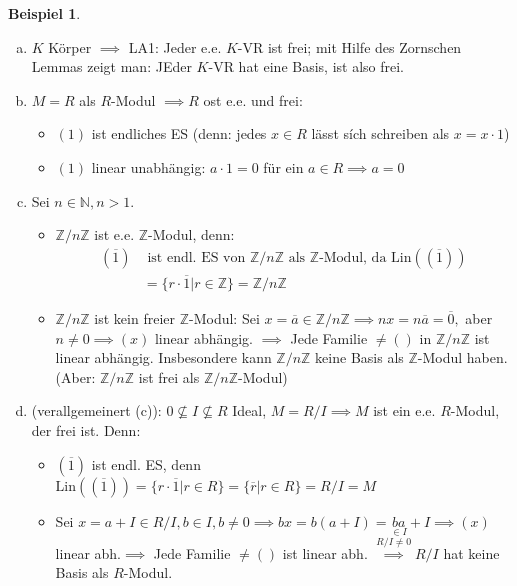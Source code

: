 \documentclass[a4paper, titlepage]{article}
\theoremstyle{definition}
\newtheorem{bsp}[satz]{Beispiel}
\newcommand{\N}{\mathbb{N}}
\newcommand{\Z}{\mathbb{Z}}
\newcommand{\Lin}{\mathrm{Lin}}
\begin{document}
        \begin{bsp}
            \begin{enumerate}[(a)]
                \item $K$ Körper $\implies$ LA1: Jeder e.e. $K$-VR ist frei; mit Hilfe des Zornschen Lemmas zeigt man: JEder $K$-VR hat eine Basis, ist also frei.
                \item $M=R$ als $R$-Modul $\implies R$ ost e.e. und frei: 
                \begin{itemize}
                    \item $(1)$ ist endliches ES (denn: jedes $x\in R$ lässt sích schreiben als $x=x\cdot 1$)
                    \item $(1)$ linear unabhängig: $a\cdot 1=0$ für ein $a\in R\implies a=0$
                \end{itemize}
                \item Sei $n\in \N,n>1.$
                \begin{itemize}
                    \item $\Z/n\Z$ ist e.e. $\Z$-Modul, denn:
                    \begin{align*}
                    (\overline{1}) &\text{ ist endl. ES von }\Z/n\Z\text{ als }\Z\text{-Modul, da }\Lin((\overline{1}))\\
                    &=\{r\cdot \overline{1}|r\in \Z\}=\Z/n\Z
                    \end{align*}
                    \item $\Z/n\Z$ ist kein freier $\Z$-Modul:
                    Sei $x=\overline{a}\in \Z/n\Z\implies nx=n\overline{a}=\overline{0},$ aber $n\neq 0\implies (x)$ linear abhängig. $\implies$ Jede Familie $\neq ()$ in $\Z/n\Z$ ist linear abhängig. Insbesondere kann $\Z/n\Z$ keine Basis als $\Z$-Modul haben. (Aber: $\Z/n\Z$ ist frei als $\Z/n\Z$-Modul)
                \end{itemize}
                    \item (verallgemeinert (c)): \newline 
                    $0\not\subseteq I \not\subseteq R$ Ideal, $M=R/I\implies M$ ist ein e.e. $R$-Modul, der frei ist. Denn:
                    \begin{itemize}
                        \item  $(\overline{1})$ ist endl. ES, denn $\Lin((\overline{1}))=\{r\cdot \overline{1}|r\in R\}=\{\overline{r}|r\in R\}=R/I=M$
                        \item Sei $x=a+I\in R/I,b\in I,b\neq 0\implies bx=b(a+I)=\underset{\in I}{ba}+I\implies (x)$ linear abh.$\implies$ Jede Familie $\neq ()$ ist linear abh. $\overset{R/I\neq 0}{\implies}R/I$ hat keine Basis als $R$-Modul. 
                    \end{itemize}
            \end{enumerate}
        \end{bsp}
\end{document}
